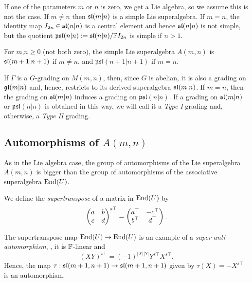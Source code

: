 If one of the parameters $m$ or $n$ is zero, we get a Lie algebra, so we assume this is not the case. If $m\neq n$ then $\mathfrak{sl}(m|n)$ is a simple Lie superalgebra. If $m=n$, the identity map $I_{2n}\in \mathfrak{sl}(n|n)$ is a central element and hence $\mathfrak{sl}(n|n)$ is not simple, but the quotient $\mathfrak{psl}(n|n) := \mathfrak{sl}(n|n)/ \mathbb{F} I_{2n}$ is simple if $n>1$.

For $m$,$n\geq 0$ (not both zero), the simple Lie superalgebra $A(m,n)$ is $\mathfrak{sl}(m+1|n+1)$ if $m\neq n$, and $\mathfrak{psl}(n+1|n+1)$ if $m=n$.

\begin{defi}\label{def:Type-I}
	If $\Gamma$ is a $G$-grading on $M(m,n)$, then, since $G$ is abelian,  it is also a grading on $\mathfrak{gl}(m|n)$ and, hence, restricts to its derived superalgebra $\mathfrak{sl}(m|n)$. If $m=n$, then the grading on $\mathfrak{sl}(m|n)$ induces a grading on $\mathfrak{psl}(n|n)$.
	If a grading on $\mathfrak{sl}(m|n)$ or $\mathfrak{psl}(n|n)$ is obtained in this way, we will call it a \emph{Type I} grading and, otherwise, a \emph{Type II} grading.
\end{defi}

\subsection{Automorphisms of $A(m,n)$}\label{ssec:auto-Amn}
As in the Lie algebra case, the group of automorphisms of the Lie superalgebra $A(m,n)$ is bigger than the group of automorphisms of the associative superalgebra $\operatorname{End}(U)$.

We define the \emph{supertranspose} of a matrix in $\operatorname{End}(U)$ by
%
\begin{equation*} %
	\left( \begin{matrix}
		a & b \\
		c & d \\
	\end{matrix}\right)^{s\top} = \left( \begin{matrix}
			a\transp & -c\transp \\
			b\transp & d\transp  \\
		\end{matrix}\right).
\end{equation*}
%

The supertranspose map $\operatorname{End}(U) \to \operatorname{End}(U)$ is an example of a \emph{super-anti-automorphism}, \ie, it is $\mathbb{F}$-linear and
\[
	(XY)^{s\top} = (-1)^{|X||Y|} Y^{s\top} X^{s\top}.
\]
Hence, the map $\tau:\mathfrak{sl}(m+1,n+1)\rightarrow \mathfrak{sl}(m+1,n+1)$ given by $\tau(X) = - X^{s\top}$ is an automorphism.

